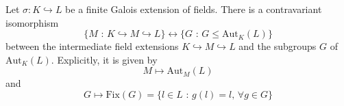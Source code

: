 \begin{theorem}
    Let $\sigma:K\hookrightarrow L$ be a finite Galois extension of fields. There is a contravariant isomorphism 
    \[ \{ M \text{ : } K\hookrightarrow M\hookrightarrow L \} \longleftrightarrow \{ G \text{ : } G\leq\text{Aut}_K(L) \} \]
    between the intermediate field extensions $K\hookrightarrow M\hookrightarrow L$ and the subgroups $G$ of $\text{Aut}_K(L)$. Explicitly, it is given by
    \[ M\longmapsto \text{Aut}_M(L) \]
    and
    \[ G \longmapsto \text{Fix}(G) = \{ l\in L \text{ : } g(l) = l\text{, }\forall g\in G\}  \]
\end{theorem}
